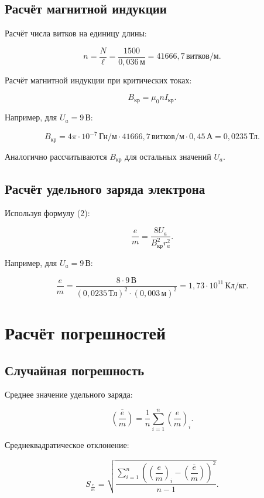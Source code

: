 \documentclass[14pt]{extarticle}
\begin{document}
\subsection{Расчёт магнитной индукции}

Расчёт числа витков на единицу длины:


$$ n = \dfrac{N}{\ell} = \dfrac{1500}{0{,}036\,\text{м}} = 41666{,}7\,\text{витков/м}. $$


Расчёт магнитной индукции при критических токах:


$$ B_{\text{кр}} = \mu_0 n I_{\text{кр}}. $$


Например, для $U_a = 9\,\text{В}$:


$$ B_{\text{кр}} = 4\pi \cdot 10^{-7}\,\text{Гн/м} \cdot 41666{,}7\,\text{витков/м} \cdot 0{,}45\,\text{А} = 0{,}0235\,\text{Тл}. $$


Аналогично рассчитываются $B_{\text{кр}}$ для остальных значений $U_a$.

\subsection{Расчёт удельного заряда электрона}

Используя формулу (2):


$$ \frac{e}{m} = \frac{8U_a}{B_{\text{кр}}^2 r_a^2}. $$


Например, для $U_a = 9\,\text{В}$:


$$ \frac{e}{m} = \frac{8 \cdot 9\,\text{В}}{(0{,}0235\,\text{Тл})^2 \cdot (0{,}003\,\text{м})^2} = 1{,}73 \cdot 10^{11}\,\text{Кл/кг}. $$


\section{Расчёт погрешностей}

\subsection{Случайная погрешность}

Среднее значение удельного заряда:


$$ \overline{\left( \dfrac{e}{m} \right)} = \dfrac{1}{n} \sum_{i=1}^{n} \left( \dfrac{e}{m} \right)_i. $$


Среднеквадратическое отклонение:


$$ S_{\frac{e}{m}} = \sqrt{\dfrac{\sum\limits_{i=1}^{n} \left( \left( \dfrac{e}{m} \right)_i - \overline{\left( \dfrac{e}{m} \right)} \right)^2}{n-1}}. $$
\end{document}
